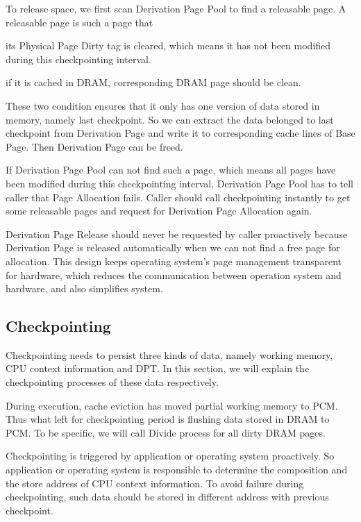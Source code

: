 \documentclass[conference]{IEEEtran}
\begin{document}
To release space, we first scan Derivation Page Pool to find a releasable page.
A releasable page is such a page that
\begin{enumerate*}
    \item its Physical Page Dirty tag is cleared, which means it has not been modified during this checkpointing interval.
    \item if it is cached in DRAM, corresponding DRAM page should be clean.
\end{enumerate*}
These two condition ensures that it only has one version of data stored in memory, namely last checkpoint.
So we can extract the data belonged to last checkpoint from Derivation Page and write it to corresponding cache lines of Base Page.
Then Derivation Page can be freed.

If Derivation Page Pool can not find such a page, which means all pages have been modified during this checkpointing interval, Derivation Page Pool has to tell caller that Page Allocation fails.
Caller should call checkpointing instantly to get some releasable pages and request for Derivation Page Allocation again.

Derivation Page Release should never be requested by caller proactively because Derivation Page is released automatically when we can not find a free page for allocation.
This design keeps operating system's page management transparent for hardware, which reduces the communication between operation system and hardware, and also simplifies system.

\subsection{Checkpointing}

Checkpointing needs to persist three kinds of data, namely working memory, CPU context information and DPT\@.
In this section, we will explain the checkpointing processes of these data respectively.

During execution, cache eviction has moved partial working memory to PCM\@.
Thus what left for checkpointing period is flushing data stored in DRAM to PCM\@.
To be specific, we will call Divide process for all dirty DRAM pages.

Checkpointing is triggered by application or operating system proactively.
So application or operating system is responsible to determine the composition and the store address of CPU context information.
To avoid failure during checkpointing, such data should be stored in different address with previous checkpoint.
\end{document}
